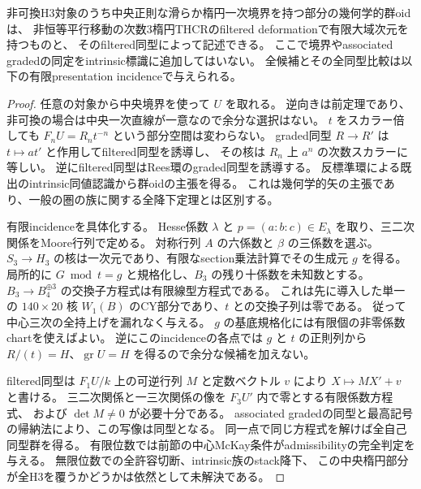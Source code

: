 \begin{corollary}[非可換中央楕円枝の全候補と幾何学的矢]
\label{cor:filtered-elliptic-geometric-groupoid}
非可換H3対象のうち中央正則な滑らか楕円一次境界を持つ部分の幾何学的群oidは、
非恒等平行移動の次数3楕円THCRのfiltered deformationで有限大域次元を持つものと、
そのfiltered同型によって記述できる。
ここで境界やassociated gradedの同定をintrinsic標識に追加してはいない。
全候補とその全同型比較は以下の有限presentation incidenceで与えられる。
\end{corollary}
\begin{proof}
任意の対象から中央境界を使って $U$ を取れる。
逆向きは前定理であり、非可換の場合は中央一次直線が一意なので余分な選択はない。
$t$ をスカラー倍しても $F_nU=R_n t^{-n}$ という部分空間は変わらない。
graded同型 $R\to R'$ は $t\mapsto a t'$ と作用してfiltered同型を誘導し、
その核は $R_n$ 上 $a^n$ の次数スカラーに等しい。
逆にfiltered同型はRees環のgraded同型を誘導する。
反標準環による既出のintrinsic同値認識から群oidの主張を得る。
これは幾何学的矢の主張であり、一般の圏の族に関する全降下定理とは区別する。

有限incidenceを具体化する。
Hesse係数 $\lambda$ と $p=(a:b:c)\in E_\lambda$ を取り、三二次関係をMoore行列で定める。
対称行列 $A$ の六係数と $\beta$ の三係数を選ぶ。
$S_3\to H_3$ の核は一次元であり、有限なsection乗法計算でその生成元 $g$ を得る。
局所的に $G\bmod t=g$ と規格化し、$B_3$ の残り十係数を未知数とする。
$B_3\to B_4^{\oplus3}$ の交換子方程式は有限線型方程式である。
これは先に導入した単一の $140\times20$ 核 $W_1(B)$ のCY部分であり、$t$ との交換子列は零である。
従って中心三次の全持上げを漏れなく与える。
$g$ の基底規格化には有限個の非零係数chartを使えばよい。
逆にこのincidenceの各点では $g$ と $t$ の正則列から
$R/(t)=H$、$\operatorname{gr}U=H$ を得るので余分な候補を加えない。

filtered同型は $F_1U/k$ 上の可逆行列 $M$ と定数ベクトル $v$ により
$X\mapsto MX'+v$ と書ける。
三二次関係と一三次関係の像を $F_3U'$ 内で零とする有限係数方程式、
および $\det M\ne0$ が必要十分である。
associated gradedの同型と最高記号の帰納法により、この写像は同型となる。
同一点で同じ方程式を解けば全自己同型群を得る。
有限位数では前節の中心McKay条件がadmissibilityの完全判定を与える。
無限位数での全許容切断、intrinsic族のstack降下、
この中央楕円部分が全H3を覆うかどうかは依然として未解決である。
\end{proof}
